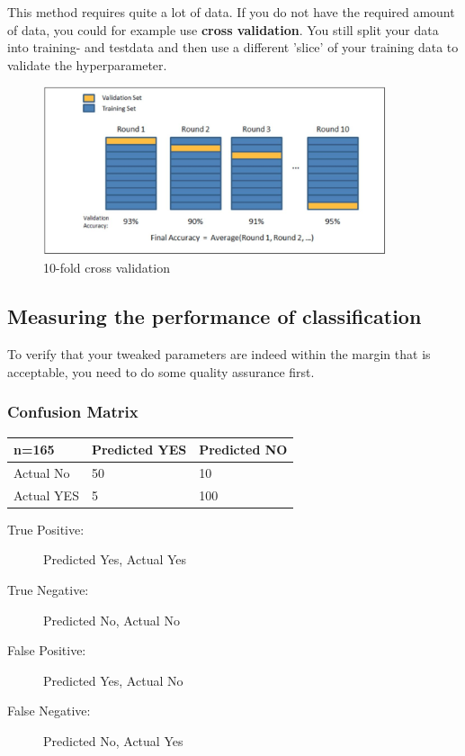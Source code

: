 \documentclass[11pt]{article}
\renewcommand*{\thead}[1]{\bfseries #1}
\begin{document}
This method requires quite a lot of data. If you do not have the required amount of data, you could for example use \textbf{cross validation}. You still split your data into training- and testdata and then use a different 'slice' of your training data to validate the hyperparameter.

\begin{figure}[htb!]
    \centering
    \includegraphics[keepaspectratio=true,width=0.9\textwidth]{cross_validation.png}
    \caption{10-fold cross validation}
    \label{fig:cross_validation}
\end{figure}

\subsection{Measuring the performance of classification}

To verify that your tweaked parameters are indeed within the margin that is acceptable, you need to do some quality assurance first.

\subsubsection{Confusion Matrix}

\begin{minipage}{0.45\textwidth}
    \begin{tabular}{|p{1.5cm}|p{1.5cm}|p{1.5cm}|}
        \hline
        \thead{n=165} & Predicted YES & Predicted NO \\
        \hline
        Actual No     & 50            & 10           \\
        \hline
        Actual YES    & 5             & 100          \\
        \hline
    \end{tabular}
\end{minipage}\hfill
\begin{minipage}{0.55\textwidth}
    \begin{description}
        \item[True Positive: ] Predicted Yes, Actual Yes
        \item[True Negative: ] Predicted No, Actual No
        \item[False Positive: ] Predicted Yes, Actual No
        \item[False Negative: ] Predicted No, Actual Yes
    \end{description}
\end{minipage}
\end{document}
